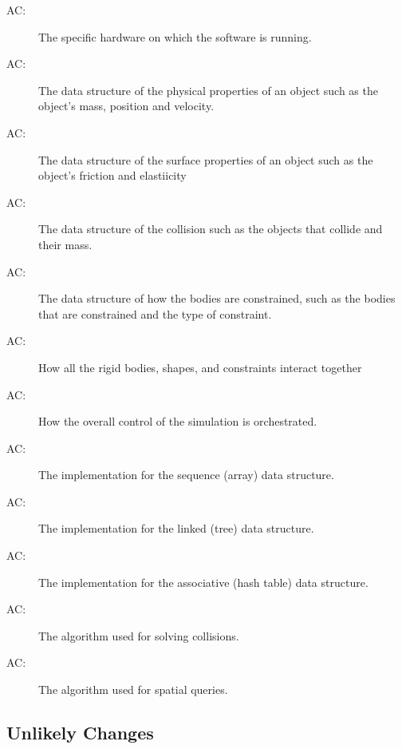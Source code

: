 \documentclass[12pt]{article}
\newcounter{acnum}
\newcommand{\actheacnum}{AC\theacnum}
\begin{document}
\begin{description}
\item[ \actheacnum \label{acHardware}:] The specific
  hardware on which the software is running.
\item[ \actheacnum \label{acBody}:] The data structure of the
physical properties of an object such as the object's mass, position and velocity.
\item[ \actheacnum \label{acShape}:] The data structure of the
surface properties of an object such as the object's friction and elastiicity
\item[ \actheacnum \label{acCollision}:] The data structure of the 
collision such as the objects that collide and their mass. 
\item[ \actheacnum \label{acConstraint}:] The data structure 
of how the bodies are constrained, such as the bodies that are constrained and the
type of constraint. 
\item[ \actheacnum \label{acSpace}:] How all the rigid
bodies, shapes, and constraints interact together
\item[ \actheacnum \label{acControl}:] How the overall
  control of the simulation is orchestrated.
\item[ \actheacnum \label{acSeqDS}:] The implementation
  for the sequence (array) data structure.
  
\item[ \actheacnum \label{acLinkDS}:] The implementation
  for the linked (tree) data structure.
  
\item[ \actheacnum \label{acAssDS}:] The implementation
  for the associative (hash table) data structure.
  
\item[ \actheacnum \label{acSolver}:] The algorithm used
  for solving collisions.
\item[ \actheacnum \label{acQuery}:] The algorithm used
  for spatial queries.
\end{description}

\subsection{Unlikely Changes} \label{SecUchange}
\end{document}
